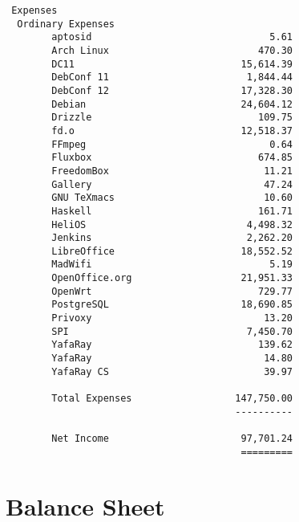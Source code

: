\documentclass[letterpaper]{report}
\begin{document}
\begin{verbatim}
 Expenses
  Ordinary Expenses
        aptosid                               5.61
        Arch Linux                          470.30
        DC11                             15,614.39
        DebConf 11                        1,844.44
        DebConf 12                       17,328.30
        Debian                           24,604.12
        Drizzle                             109.75
        fd.o                             12,518.37
        FFmpeg                                0.64
        Fluxbox                             674.85
        FreedomBox                           11.21
        Gallery                              47.24
        GNU TeXmacs                          10.60
        Haskell                             161.71
        HeliOS                            4,498.32
        Jenkins                           2,262.20
        LibreOffice                      18,552.52
        MadWifi                               5.19
        OpenOffice.org                   21,951.33
        OpenWrt                             729.77
        PostgreSQL                       18,690.85
        Privoxy                              13.20
        SPI                               7,450.70
        YafaRay                             139.62
        YafaRay                              14.80
        YafaRay CS                           39.97

        Total Expenses                  147,750.00
                                        ----------

        Net Income                       97,701.24
                                         =========
\end{verbatim}

\section{Balance Sheet}
\end{document}
